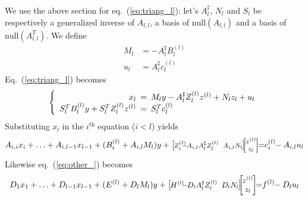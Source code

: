 \documentclass[]{article}
\theoremstyle{definition}
\newcommand{\BIN}{\begin{bmatrix}}
\newcommand{\BOUT}{\end{bmatrix}}
\begin{document}
We use the above section for eq.~(\ref{eq:triang_l}): let's $A_l^\sharp$, $N_l$ and $S_l$ be respectively a generalized inverse of $A_{l,l}$, a basis of $\mathrm{null}(A_{l,l})$ and a basis of $\mathrm{null}(A_{l,l}^T)$.
We define
\begin{align*}
	M_l &= -A_l^\sharp B_l^{(l)}\\
	u_l &= A_l^\sharp c_l^{(l)}
\end{align*}
Eq.~(\ref{eq:triang_l}) becomes
\begin{equation}
	\left\{ \begin{array}{rcl}
	x_l \hspace{-5pt}&=&\hspace{-5pt} M_l y -A_l^\sharp Z_l^{(l)} z^{(l)} + N_l z_l + u_l \\
	S_l^T B_l^{(l)} y + S_l^T Z_l^{(l)} z^{(l)} \hspace{-5pt}&=&\hspace{-5pt} S_l^T c_l^{(l)}
	\end{array}\right.
\end{equation}
Substituting $x_l$ in the $i^{\mathrm{th}}$ equation ($i<l$) yields
\begin{equation*}
\footnotesize
  A_{i,i} x_i + \ldots + A_{i,l-1} x_{l-1} + (B_i^{(l)} + A_{i,l} M_l)y
	+ \BIN\hspace{-1pt} Z_i^{(l)} \hspace{-7pt}-\hspace{-3pt} A_{i,l} A_l^\sharp Z_l^{(l)} &\hspace{-5pt} A_{i,l} N_l\hspace{-1pt}\BOUT\hspace{-5pt} \BIN \hspace{-1pt}z^{(l)}\hspace{-1pt} \\ z_l \BOUT \hspace{-4pt}
	= \hspace{-3pt} c_i^{(l)} \hspace{-3pt}- A_{i,l} u_l
\end{equation*}
Likewise eq.~(\ref{eq:other_}) becomes
\begin{equation*}
\small
  D_1 x_ 1+ \ldots + D_{l-1} x_{l-1} + (E^{(l)} + D_l M_l)y
	+ \BIN\hspace{-1pt} H^{(l)} \hspace{-5pt}-\hspace{-3pt} D_l A_l^\sharp Z_l^{(l)} &\hspace{-5pt} D_l N_l\hspace{-1pt}\BOUT\hspace{-5pt} \BIN \hspace{-1pt}z^{(l)}\hspace{-1pt} \\ z_l \BOUT \hspace{-4pt}
	= \hspace{-3pt} f^{(l)} \hspace{-3pt}- D_l u_l
\end{equation*}
\end{document}
